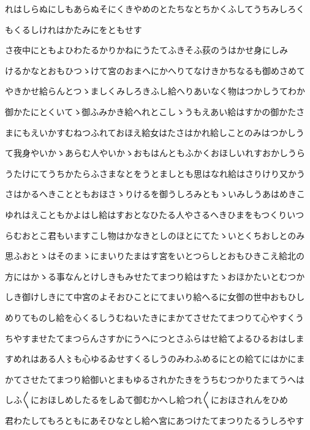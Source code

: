 \documentclass[a4paper,11pt,landscape]{ltjtarticle}
\begin{document}
\par\medskip
れはしらぬにしもあらぬそにくきやめのとたちなとちかくふしてうちみしろく
\par\medskip
もくるしけれはかたみにをともせす
\par\medskip
さ夜中にともよひわたるかりかねにうたてふきそふ荻のうはかせ身にしみ
\par\medskip
けるかなとおもひつゝけて宮のおまへにかへりてなけきかちなるも御めさめて
\par\medskip
やきかせ給らんとつゝましくみしろきふし給へりあいなく物はつかしうてわか
\par\medskip
御かたにとくいてゝ御ふみかき給へれとこしゝうもえあい給はすかの御かたさ
\par\medskip
まにもえいかすむねつふれておほえ給女はたさはかれ給しことのみはつかしう
\par\medskip
て我身やいかゝあらむ人やいかゝおもはんともふかくおほしいれすおかしうら
\par\medskip
うたけにてうちかたらふさまなとをうとましとも思はなれ給はさりけり又かう
\par\medskip
さはかるへきことともおほさゝりけるを御うしろみともゝいみしうあはめきこ
\par\medskip
ゆれはえこともかよはし給はすおとなひたる人やさるへきひまをもつくりいつ
\par\medskip
らむおとこ君もいますこし物はかなきとしのほとにてたゝいとくちおしとのみ
\par\medskip
思ふおとゝはそのまゝにまいりたまはす宮をいとつらしとおもひきこえ給北の
\par\medskip
方にはかゝる事なんとけしきもみせたてまつり給はすたゝおほかたいとむつか
\par\medskip
しき御けしきにて中宮のよそおひことにてまいり給へるに女御の世中おもひし
\par\medskip
めりてものし給を心くるしうむねいたきにまかてさせたてまつりて心やすくう
\par\medskip
ちやすませたてまつらんさすかにうへにつとさふらはせ給てよるひるおはしま
\par\medskip
すめれはある人〻も心ゆるゐせすくるしうのみわふめるにとの給てにはかにま
\par\medskip
かてさせたてまつり給御いとまもゆるされかたきをうちむつかりたまてうへは
\par\medskip
しふ〱におほしめしたるをしゐて御むかへし給つれ〱におほされんをひめ
\par\medskip
君わたしてもろともにあそひなとし給へ宮にあつけたてまつりたるうしろやす
\par\medskip
\end{document}

